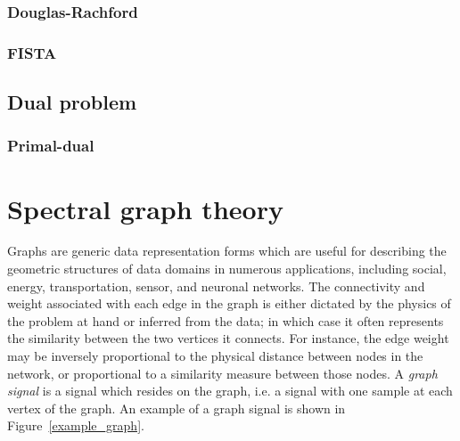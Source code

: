 \documentclass[a4paper,12pt,twoside]{report}
\newcommand{\figref}[1]{Figure~\ref{#1}}
\begin{document}
\subsection{Douglas-Rachford}

\subsection{FISTA}

\section{Dual problem}

\subsection{Primal-dual}

\chapter{Spectral graph theory}


Graphs are generic data representation forms which are useful for describing the geometric structures of data domains in numerous applications, including social, energy, transportation, sensor, and neuronal networks. The connectivity and weight associated with each edge in the graph is either dictated by the physics of the problem at hand or inferred from the data; in which case it often represents the similarity between the two vertices it connects. For instance, the edge weight may be inversely proportional to the physical distance between nodes in the network, or proportional to a similarity measure between those nodes. A \textit{graph signal} is a signal which resides on the graph, i.e. a signal with one sample at each vertex of the graph. An example of a graph signal is shown in \figref{example_graph}.
\end{document}
